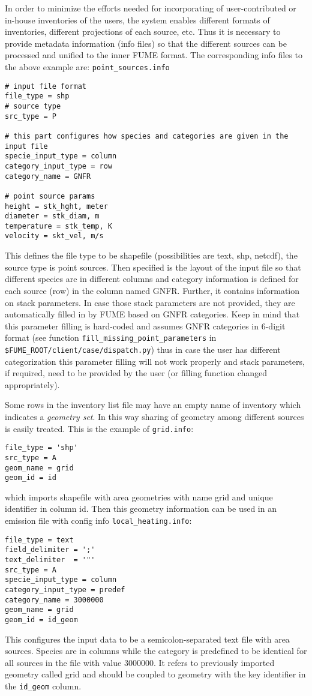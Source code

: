 \documentclass[a4paper,11pt]{article}
\begin{document}
In order to minimize the efforts needed for incorporating of
user-contributed or in-house inventories of the users, the system
enables different formats of inventories, different projections of each
source, etc. Thus it is necessary to provide metadata information (info files) so that the different sources can be processed and unified to the inner FUME format. 
The corresponding info files to the above example are: \verb|point_sources.info|
\begin{verbatim} 
# input file format
file_type = shp
# source type
src_type = P

# this part configures how species and categories are given in the input file
specie_input_type = column
category_input_type = row
category_name = GNFR

# point source params
height = stk_hght, meter
diameter = stk_diam, m
temperature = stk_temp, K
velocity = skt_vel, m/s
\end{verbatim} 
This defines the file type to be shapefile (possibilities are text, shp, netcdf), the source type is point sources. Then specified is the layout of the input file so that different species are in different columns and category information is defined for each source (row) in the column named GNFR. Further, it contains information on stack parameters. In case those stack parameters are not provided, they are automatically filled in by FUME based on GNFR categories. Keep in mind that this parameter filling is hard-coded and assumes GNFR categories in 6-digit format (see function \verb|fill_missing_point_parameters| in \verb|$FUME_ROOT/client/case/dispatch.py|) thus in case the user has different categorization this parameter filling will not work properly and stack parameters, if required, need to be provided by the user (or filling function changed appropriately).

Some rows in the inventory list file may have an empty name of inventory which indicates a {\em geometry set}. In this way sharing of geometry among different sources is easily treated. This is the example of \verb|grid.info|:
\begin{verbatim}
file_type = 'shp'
src_type = A
geom_name = grid
geom_id = id
\end{verbatim}
which imports shapefile with area geometries with name grid and unique identifier in column id. Then this geometry information can be used in an emission file with config info \verb|local_heating.info|:
\begin{verbatim}
file_type = text
field_delimiter = ';'
text_delimiter  = '"'
src_type = A
specie_input_type = column
category_input_type = predef
category_name = 3000000
geom_name = grid
geom_id = id_geom
\end{verbatim}
This configures the input data to be a semicolon-separated text file with area sources. Species are in columns while the category is predefined to be identical for all sources in the file with value 3000000. It refers to previously imported geometry called grid and should be coupled to geometry with the key identifier in the \verb|id_geom| column.
\end{document}
